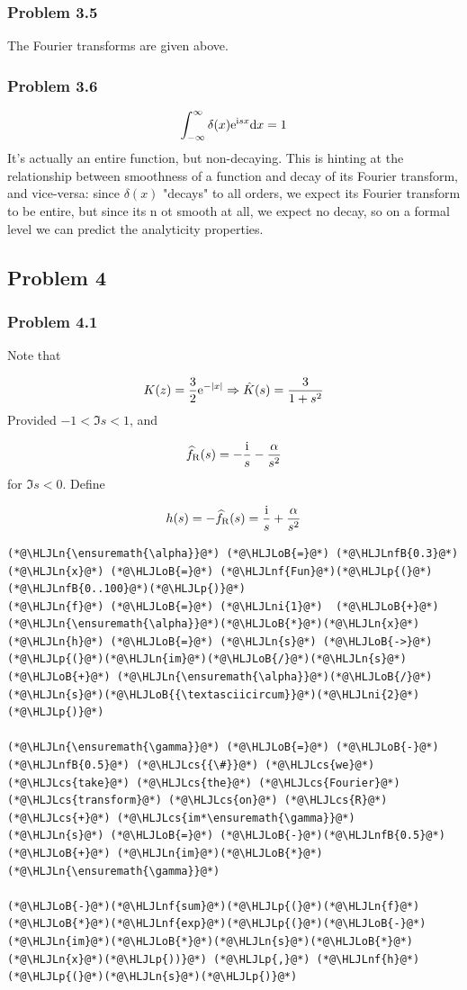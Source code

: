 \documentclass[12pt,a4paper]{article}
\newcommand{\HLJLn}[1]{#1}
\newcommand{\HLJLnf}[1]{\textcolor[RGB]{66,102,213}{#1}}
\newcommand{\HLJLnfB}[1]{\textcolor[RGB]{59,151,46}{#1}}
\newcommand{\HLJLni}[1]{\textcolor[RGB]{59,151,46}{#1}}
\newcommand{\HLJLoB}[1]{\textcolor[RGB]{102,102,102}{\textbf{#1}}}
\newcommand{\HLJLp}[1]{#1}
\newcommand{\HLJLcs}[1]{\textcolor[RGB]{153,153,119}{\textit{#1}}}
\def\D{ {\rm d} }
\def\I{ {\rm i} }
\def\E{ {\rm e} }
\def\dx{\D x}
\begin{document}
\subsubsection{Problem 3.5}
The Fourier transforms are given above.

\subsubsection{Problem 3.6}
\[
\int_{-\infty}^\infty \delta(x) \E^{\I s x} \dx = 1
\]
It's actually an entire function, but non-decaying. This is hinting at the relationship between smoothness of a function and decay of its Fourier transform, and vice-versa: since $\delta(x)$ "decays" to all orders, we expect its Fourier transform to be entire, but since its n ot smooth at all, we expect no decay, so on a formal level we can predict the analyticity properties.

\subsection{Problem 4}
\subsubsection{Problem 4.1}
Note that

\[
K(z) =  {3\over 2} \E^{-|x|} \Rightarrow \hat K(s) = {3 \over 1+s^2}
\]
Provided $-1 < \Im s < 1$, and 

\[
\widehat f_{\rm R}(s) = -{\I \over s} - {\alpha \over s^2}
\]
for $\Im s < 0$.  Define

\[
h(s) = - \widehat f_{\rm R}(s) = {\I \over s} + {\alpha \over s^2}
\]

\begin{lstlisting}
(*@\HLJLn{\ensuremath{\alpha}}@*) (*@\HLJLoB{=}@*) (*@\HLJLnfB{0.3}@*)
(*@\HLJLn{x}@*) (*@\HLJLoB{=}@*) (*@\HLJLnf{Fun}@*)(*@\HLJLp{(}@*)(*@\HLJLnfB{0..100}@*)(*@\HLJLp{)}@*)
(*@\HLJLn{f}@*) (*@\HLJLoB{=}@*) (*@\HLJLni{1}@*)  (*@\HLJLoB{+}@*) (*@\HLJLn{\ensuremath{\alpha}}@*)(*@\HLJLoB{*}@*)(*@\HLJLn{x}@*)
(*@\HLJLn{h}@*) (*@\HLJLoB{=}@*) (*@\HLJLn{s}@*) (*@\HLJLoB{->}@*) (*@\HLJLp{(}@*)(*@\HLJLn{im}@*)(*@\HLJLoB{/}@*)(*@\HLJLn{s}@*) (*@\HLJLoB{+}@*) (*@\HLJLn{\ensuremath{\alpha}}@*)(*@\HLJLoB{/}@*)(*@\HLJLn{s}@*)(*@\HLJLoB{{\textasciicircum}}@*)(*@\HLJLni{2}@*)(*@\HLJLp{)}@*)

(*@\HLJLn{\ensuremath{\gamma}}@*) (*@\HLJLoB{=}@*) (*@\HLJLoB{-}@*)(*@\HLJLnfB{0.5}@*) (*@\HLJLcs{{\#}}@*) (*@\HLJLcs{we}@*) (*@\HLJLcs{take}@*) (*@\HLJLcs{the}@*) (*@\HLJLcs{Fourier}@*) (*@\HLJLcs{transform}@*) (*@\HLJLcs{on}@*) (*@\HLJLcs{R}@*) (*@\HLJLcs{+}@*) (*@\HLJLcs{im*\ensuremath{\gamma}}@*)
(*@\HLJLn{s}@*) (*@\HLJLoB{=}@*) (*@\HLJLoB{-}@*)(*@\HLJLnfB{0.5}@*) (*@\HLJLoB{+}@*) (*@\HLJLn{im}@*)(*@\HLJLoB{*}@*)(*@\HLJLn{\ensuremath{\gamma}}@*)

(*@\HLJLoB{-}@*)(*@\HLJLnf{sum}@*)(*@\HLJLp{(}@*)(*@\HLJLn{f}@*)(*@\HLJLoB{*}@*)(*@\HLJLnf{exp}@*)(*@\HLJLp{(}@*)(*@\HLJLoB{-}@*)(*@\HLJLn{im}@*)(*@\HLJLoB{*}@*)(*@\HLJLn{s}@*)(*@\HLJLoB{*}@*)(*@\HLJLn{x}@*)(*@\HLJLp{))}@*) (*@\HLJLp{,}@*) (*@\HLJLnf{h}@*)(*@\HLJLp{(}@*)(*@\HLJLn{s}@*)(*@\HLJLp{)}@*)
\end{lstlisting}
\end{document}
